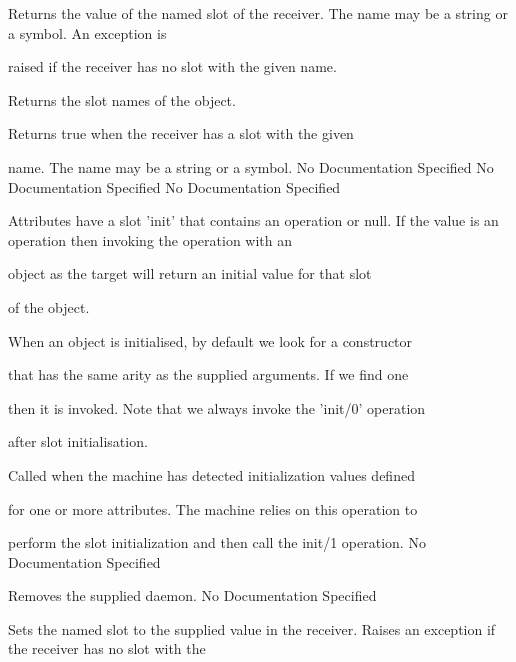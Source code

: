       Returns the value of the named slot of the receiver.
      The name may be a string or a symbol. An exception is

      raised if the receiver has no slot with the given name.

      Returns the slot names of the object.

      Returns true when the receiver has a slot with the given

      name. The name may be a string or a symbol.
No Documentation Specified
No Documentation Specified
No Documentation Specified

      Attributes have a slot 'init' that contains an operation or null.
      If the value is an operation then invoking the operation with an

      object as the target will return an initial value for that slot

      of the object.

      When an object is initialised, by default we look for a constructor

      that has the same arity as the supplied arguments. If we find one

      then it is invoked. Note that we always invoke the 'init/0' operation

      after slot initialisation.

      Called when the machine has detected initialization values defined

      for one or more attributes. The machine relies on this operation to

      perform the slot initialization and then call the init/1 operation.
No Documentation Specified

      Removes the supplied daemon.
No Documentation Specified

      Sets the named slot to the supplied value in the receiver.
      Raises an exception if the receiver has no slot with the

